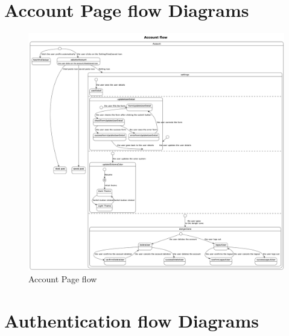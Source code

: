 \documentclass{article}
\begin{document}
    \clearpage
    \section{Account Page flow Diagrams}
    \label{sec:account_page_flow_diagrams}

    \begin{figure}[h]
        \centering
        \includegraphics[width=1\textwidth]{account_page_flow}
        \caption{Account Page flow}
        \label{fig:figure6}
    \end{figure}

    \clearpage
    \section{Authentication flow Diagrams}
    \label{sec:authentication_flow_diagrams}
\end{document}
